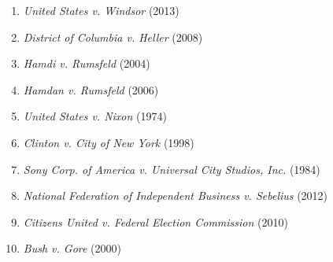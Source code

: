 \documentclass[a4, 12pt]{article}
\begin{document}
\begin{enumerate}
\item \textit{United States v. Windsor} (2013) %

\item \textit{District of Columbia v. Heller} (2008) %


\item \textit{Hamdi v. Rumsfeld} (2004) %
\item \textit{Hamdan v. Rumsfeld} (2006) %

\item \textit{United States v. Nixon} (1974) %
\item \textit{Clinton v. City of New York} (1998) %

\item \textit{Sony Corp. of America v. Universal City Studios, Inc.} (1984) %

\item \textit{National Federation of Independent Business v. Sebelius} (2012) %

\item \textit{Citizens United v. Federal Election Commission} (2010) %

\item \textit{Bush v. Gore} (2000) %

\end{enumerate}
\end{document}
